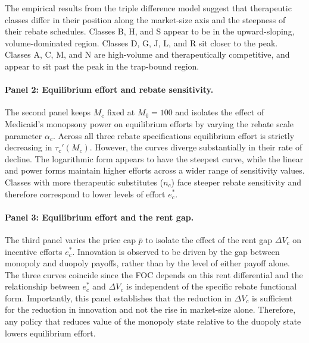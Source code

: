 \documentclass[12pt]{article}
\begin{document}
The empirical results from the triple difference model suggest that therapeutic classes differ in their position along the market-size axis and the steepness of their rebate schedules. Classes B, H, and S appear to be in the upward-sloping, volume-dominated region. Classes D, G, J, L, and R sit closer to the peak. Classes A, C, M, and N are high-volume and therapeutically competitive, and appear to sit past the peak in the trap-bound region.

\paragraph{Panel 2: Equilibrium effort and rebate sensitivity.}
The second panel keeps $M_c$ fixed at $M_0 = 100$ and isolates the effect of Medicaid's monopsony power on equilibrium efforts by varying the rebate scale parameter $\alpha_c$. Across all three rebate specifications equilibrium effort is strictly decreasing in $\tau_c'(M_c)$. However, the curves diverge substantially in their rate of decline. The logarithmic form appears to have the steepest curve, while the linear and power forms maintain higher efforts across a wider range of sensitivity values. Classes with more therapeutic substitutes ($n_c$) face steeper rebate sensitivity and therefore correspond to lower levels of effort $e_c^*$.

\paragraph{Panel 3: Equilibrium effort and the rent gap.}
The third panel varies the price cap $\bar{p}$ to isolate the effect of the rent gap $\Delta V_c$ on incentive efforts $e_c^*$. Innovation is observed to be driven by the gap between monopoly and duopoly payoffs, rather than by the level of either payoff alone. The three curves coincide since the FOC depends on this rent differential and the relationship between $e_c^*$ and $\Delta V_c$ is independent of the specific rebate functional form. Importantly, this panel establishes that the reduction in $\Delta V_c$ is sufficient for the reduction in innovation and not the rise in market-size alone. Therefore, any policy that reduces value of the monopoly state relative to the duopoly state lowers equilibrium effort.
\end{document}
